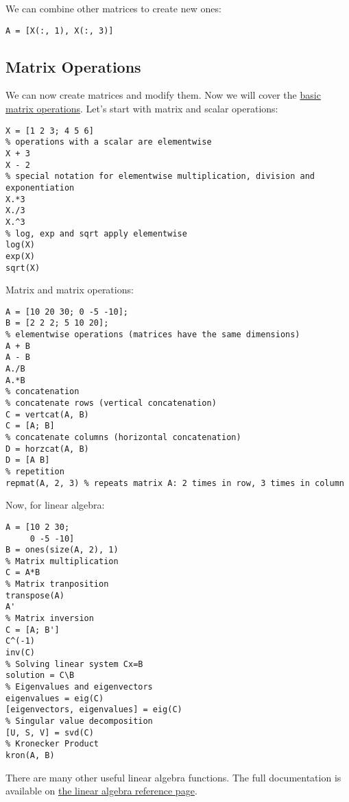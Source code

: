 \documentclass[12pt, a4paper]{article}
\begin{document}
We can combine other matrices to create new ones:
\lstset{language=matlab,label= ,caption= ,captionpos=b,firstnumber=1,numbers=left,style=Matlab-editor}
\begin{lstlisting}
A = [X(:, 1), X(:, 3)]
\end{lstlisting}
\subsection{Matrix Operations}
\label{sec:orgc264508}
We can now create matrices and modify them.
Now we will cover the \href{https://www.mathworks.com/help/matlab/math/basic-matrix-operations.html;jsessionid=e2359d161cc1539728b94fe2fea9}{basic matrix operations}.
Let's start with matrix and scalar operations:
\lstset{language=matlab,label= ,caption= ,captionpos=b,firstnumber=1,numbers=left,style=Matlab-editor}
\begin{lstlisting}
X = [1 2 3; 4 5 6]
% operations with a scalar are elementwise
X + 3
X - 2
% special notation for elementwise multiplication, division and exponentiation
X.*3
X./3
X.^3
% log, exp and sqrt apply elementwise
log(X)
exp(X)
sqrt(X)
\end{lstlisting}

Matrix and matrix operations:
\lstset{language=matlab,label= ,caption= ,captionpos=b,firstnumber=1,numbers=left,style=Matlab-editor}
\begin{lstlisting}
A = [10 20 30; 0 -5 -10];
B = [2 2 2; 5 10 20];
% elementwise operations (matrices have the same dimensions)
A + B
A - B
A./B
A.*B
% concatenation
% concatenate rows (vertical concatenation)
C = vertcat(A, B)
C = [A; B]
% concatenate columns (horizontal concatenation)
D = horzcat(A, B)
D = [A B]
% repetition
repmat(A, 2, 3) % repeats matrix A: 2 times in row, 3 times in column
\end{lstlisting}

Now, for linear algebra:
\lstset{language=matlab,label= ,caption= ,captionpos=b,firstnumber=1,numbers=left,style=Matlab-editor}
\begin{lstlisting}
A = [10 2 30;
     0 -5 -10]
B = ones(size(A, 2), 1)
% Matrix multiplication
C = A*B
% Matrix tranposition
transpose(A)
A'
% Matrix inversion
C = [A; B']
C^(-1)
inv(C)
% Solving linear system Cx=B
solution = C\B
% Eigenvalues and eigenvectors
eigenvalues = eig(C)
[eigenvectors, eigenvalues] = eig(C)
% Singular value decomposition
[U, S, V] = svd(C)
% Kronecker Product
kron(A, B)
\end{lstlisting}
There are many other useful linear algebra functions.
The full documentation is available on \href{https://www.mathworks.com/help/matlab/linear-algebra.html?s\_tid=CRUX\_lftnav}{the linear algebra reference page}.
\end{document}
